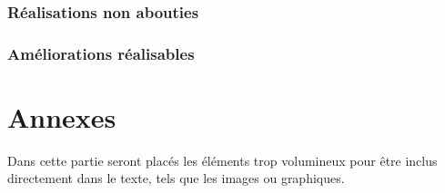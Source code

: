 \documentclass[a4paper]{article}
\newcommand{\alinea}{\hspace*{0.5cm}}
\begin{document}
	\section{Réalisations non abouties}
	
	\section{Améliorations réalisables}
	

  \newpage
  \part{Annexes}
    \alinea Dans cette partie seront placés les éléments trop volumineux pour être inclus directement dans le texte, tels que les images ou graphiques.\\
    
\end{document}
